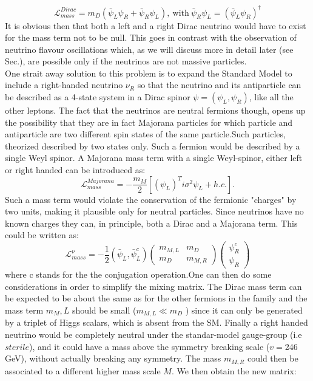 \documentclass[12pt,a4paper,openright,twoside]{report}
\begin{document}
\begin{equation}
\mathcal{L}^{Dirac}_{mass}=m_D(\bar{\psi}_L\psi_R + \bar{\psi}_R\psi_L), \ \text{with} \ \bar{\psi}_R\psi_L = (\bar{\psi}_L\psi_R)^\dagger 
\end{equation}
It is obvious then that both a left and a right Dirac neutrino would have to exist for the mass term not to be null. This goes in contrast with the observation of neutrino flavour oscillations which, as we will discuss more in detail later (see Sec.), are possible only if the neutrinos are not massive particles.
\\
One strait away solution to this problem is to expand the Standard Model to include a right-handed neutrino $\nu_R$ so that the neutrino and its antiparticle can be described as a 4-state system in a Dirac spinor $\psi=(\psi_L,\psi_R)$, like all the other leptons. The fact that the neutrinos are neutral fermions though, opens up the possibility that they are in fact Majorana particles for which particle and antiparticle are two different spin states of the same particle.Such particles, theorized  described by two states only. Such a fermion would be described by a single Weyl spinor. A Majorana mass term with a single Weyl-spinor, either left or right handed can be introduced as:
\begin{equation}
\mathcal{L}^{Majorana}_{mass}=- \frac{m_M}{2}[(\psi_L)^Ti\sigma^2\psi_L+h.c.].
\end{equation}
Such a mass term would violate the conservation of the fermionic "charges" by two units, making it plausible only for neutral particles. Since neutrinos have no known charges they can, in principle, both a Dirac and a Majorana term. This could be written as:
\begin{equation}
\mathcal{L}^\nu_{mass}=-\frac{1}{2}(\bar{\psi}_L,\bar{\psi}_L^c) \begin{pmatrix} m_{M,L} & m_D \\ m_D & m_{M,R} \end{pmatrix} \begin{pmatrix} \psi_R^c \\ \psi_R\end{pmatrix}
\end{equation}
where c stands for the the conjugation operation.One can then do some considerations in order to simplify the mixing matrix. The Dirac mass term can be expected to be about the same as for the other fermions in the family and the mass term $m_M,L$ should be small ($m_{M,L}\ll m_D$ ) since it can only be generated by a triplet of Higgs scalars, which is absent from the SM. Finally a right handed neutrino would be completely neutral under the standar-model gauge-group (i.e $sterile$), and it could have a mass above the symmetry breaking scale ($v=$246 GeV), without actually breaking any symmetry. The mass $m_{M,R}$ could then be associated to a different higher mass scale $M$. We then obtain the new matrix:
\end{document}
